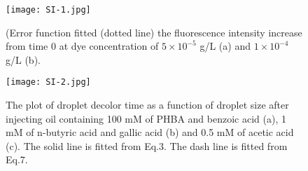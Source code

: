 \documentclass[journal=langd5,manuscript=article]{achemso}
\begin{document}
\newpage
\begin{figure}[htp]
	\texttt{[image: SI-1.jpg]}
	\caption{ (Error function fitted (dotted line) the fluorescence intensity increase from time 0 at dye concentration of $5\times 10^{-5}$ g/L (a) and $1\times 10^{-4}$ g/L (b).}
	\label{SI-1}
\end{figure}
\begin{figure}[htp]
	\texttt{[image: SI-2.jpg]}
	\caption{ The plot of droplet decolor time as a function of droplet size after injecting oil containing 100 mM of PHBA and benzoic acid (a), 1 mM of n-butyric acid and gallic acid (b) and 0.5 mM of acetic acid (c). The solid line is fitted from Eq.3. The dash line is fitted from Eq.7. }
	\label{SI-2}
\end{figure}

\end{document}
